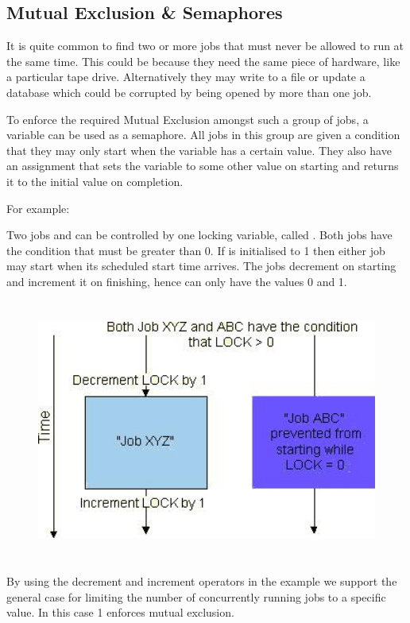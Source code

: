 \subsection{Mutual Exclusion \& Semaphores}
It is quite common to find two or more jobs that must never be allowed to run at the same time. This could be because they need the same piece
of hardware, like a particular tape drive. Alternatively they may write to a file or update a database which could be corrupted by being opened
by more than one job.

To enforce the required Mutual Exclusion amongst such a group of jobs, a variable can be used as a semaphore. All jobs in this group are given a
condition that they may only start when the variable has a certain value. They also have an assignment that sets the variable to some
other value on starting and returns it to the initial value on completion.

For example:

Two jobs  and  can be controlled by one locking variable, called .
Both jobs have the condition that  must be greater than 0. If  is initialised to 1 then either
job may start when its scheduled start time arrives. The jobs decrement  on starting and increment
it on finishing, hence  can only have the values 0 and 1.

\begin{figure}
\centering
\includegraphics[width=12.838cm,height=8.594cm]{img/ref10.jpg}
\end{figure}
By using the decrement and increment operators in the example we support the general case for limiting the number of concurrently running jobs
to a specific value. In this case 1 enforces mutual exclusion.

